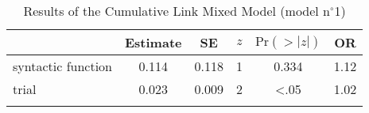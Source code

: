 \begin{table}
\begin{tabular}{l S[table-format=1.3] S[table-format=1.3] c S[table-format=<1.3] S[table-format=1.2]}
  \lsptoprule
 & {Estimate} & {SE} & {$z$} & {$\text{Pr}(>|z|)$} & {OR} \\ 
  \midrule
  syntactic function & 0.114 & 0.118 & 1 & 0.334 & 1.12 \\ 
  trial              & 0.023 & 0.009 & 2 & <.05 & 1.02 \\ 
   \lspbottomrule
\end{tabular}
\caption{Results of the Cumulative Link Mixed Model (model n$^{\circ}$1)}
\label{tab:exp13-m1}
\end{table}
